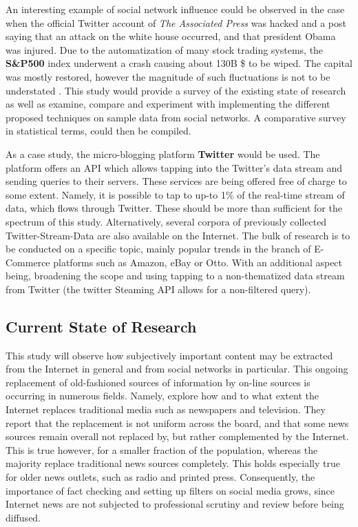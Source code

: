 		\par
		
		An interesting example of social network influence could be observed in the case when the official Twitter account of \textit{ The Associated Press} was hacked and a post saying that an attack on the white house occurred, and that president Obama was injured. Due to the automatization of many stock trading systems, the \textbf{S\&P500} index underwent a crash causing about 130B \$ to be wiped. The capital was mostly restored, however the magnitude of such fluctuations is not to be understated \cite*{fake_post}. This study would provide a survey of the existing state of research as well as examine, compare and experiment with implementing the different proposed techniques on sample data from social networks. A comparative survey in statistical terms, could then be compiled.
		
		\par
		
		As a case study, the micro-blogging platform \textbf{Twitter} would be used. The platform offers an API which allows tapping into the Twitter's data stream and sending queries to their servers. These services are being offered free of charge to some extent. Namely, it is possible to tap to up-to 1\% of the real-time stream of data, which flows through Twitter. These should be more than sufficient for the spectrum of this study. Alternatively, several corpora of previously collected Twitter-Stream-Data are also available on the Internet. The bulk of research is to be conducted on  a specific topic, mainly popular trends in the branch of E-Commerce platforms such as Amazon, eBay or Otto. With an additional aspect being, broadening the scope and using tapping to a non-thematized data stream from Twitter (the twitter Steaming API allows for a non-filtered query).
		
	\subsection{Current State of Research}
		This study will observe how subjectively important content may be extracted from the Internet in general and from social networks in particular. This ongoing replacement of old-fashioned sources of information by on-line sources is occurring in numerous fields. Namely, \cite*{gaskins2012internet} explore how and to what extent the Internet replaces traditional media such as newspapers and television. They report that the replacement is not uniform across the board, and that some news sources remain overall not replaced by, but rather complemented by the Internet. This is true however, for a smaller fraction of the population, whereas the majority replace traditional news sources completely. This holds especially true for older news outlets, such as radio and printed press. Consequently, the importance of fact checking and setting up filters on social media grows, since Internet news are not subjected to professional scrutiny and review before being diffused.
		
